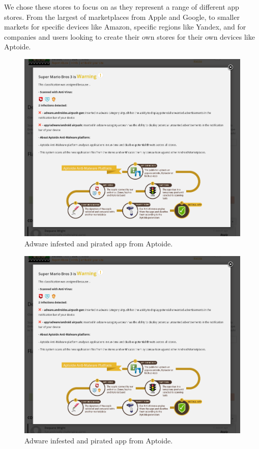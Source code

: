 \documentclass[thesis.tex]{subfiles}
\begin{document}
We chose these stores to focus on as they represent a range of different app
stores.  From the largest of marketplaces from Apple and Google, to smaller
markets for specific devices like Amazon, specific regions like Yandex, and for
companies and users looking to create their own stores for their own devices
like Aptoide.

\begin{figure}
  \centering
  \includegraphics[width=0.8\linewidth]{figures/aptoide-malware.png}
  \caption{Adware infested and pirated app from Aptoide.}
  \label{fig:aptoide-malware}
\end{figure}

\begin{figure}
  \centering
  \includegraphics[width=0.8\linewidth]{figures/aptoide-malware.png}
  \caption{Adware infested and pirated app from Aptoide.}
  \label{fig:aptoide-malware}
\end{figure}
\end{document}
